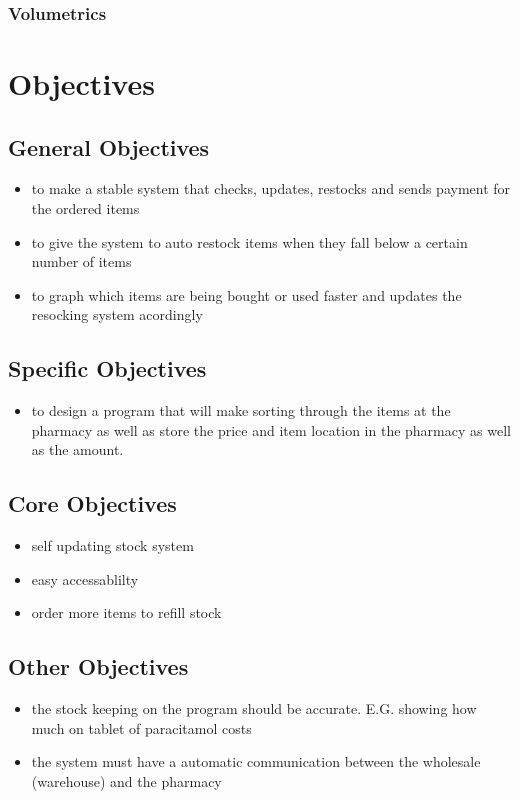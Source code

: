 \subsubsection{Volumetrics}

\section{Objectives}
\subsection{General Objectives}
\begin{itemize}
	\item to make a stable system that checks, updates, restocks and sends payment for the ordered items
	\item to give the system to auto restock items when they fall below a certain number of items
	\item to graph which items are being bought or used faster and updates the resocking system acordingly 
\end{itemize}
\subsection{Specific Objectives}
\begin{itemize}
	\item to design a program that will make sorting through the items at the pharmacy as well as store the price and item location in the pharmacy as well as the amount.
\end{itemize}
\subsection{Core Objectives}
\begin{itemize}
\item self updating stock system
\item easy accessablilty
\item order more items to refill stock
\end{itemize}
\subsection{Other Objectives}
\begin{itemize}
    \item the stock keeping on the program should be accurate. E.G. showing how much on tablet of paracitamol costs
    \item the system must have a automatic communication between the wholesale (warehouse) and the pharmacy
\end{itemize}
